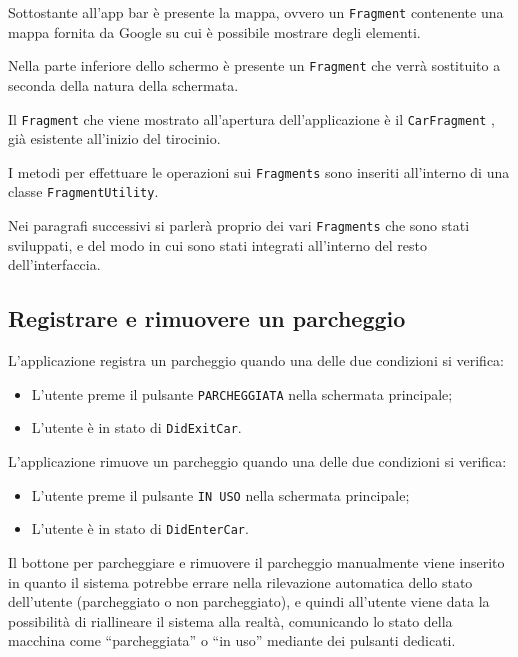 Sottostante all'app bar è presente la mappa, ovvero un \texttt{Fragment} contenente una mappa fornita da Google su cui è possibile mostrare degli elementi.

Nella parte inferiore dello schermo è presente un \texttt{Fragment} che verrà sostituito a seconda della natura della schermata.

Il \texttt{Fragment} che viene mostrato all'apertura dell'applicazione è il \texttt{CarFragment} , già esistente all'inizio del tirocinio.

I metodi per effettuare le operazioni sui \texttt{Fragments} sono inseriti all'interno di una classe \texttt{FragmentUtility}.

Nei paragrafi successivi si parlerà proprio dei vari \texttt{Fragments} che sono stati sviluppati, e del modo in cui sono stati integrati all'interno del resto dell'interfaccia.

\hypertarget{toggle-per-registrare-e-rimuovere-un-parcheggio}{%
\subsection{Registrare e rimuovere un parcheggio}\label{toggle-per-registrare-e-rimuovere-un-parcheggio}}

L'applicazione registra un parcheggio quando una delle due condizioni si verifica:

\begin{itemize}
    \item L'utente preme il pulsante \texttt{PARCHEGGIATA} nella schermata principale;
    \item L'utente è in stato di \texttt{DidExitCar}.
\end{itemize}
L'applicazione rimuove un parcheggio quando una delle due condizioni si verifica:

\begin{itemize}
    \item L'utente preme il pulsante \texttt{IN USO} nella schermata principale;
    \item L'utente è in stato di \texttt{DidEnterCar}.
\end{itemize}
Il bottone per parcheggiare e rimuovere il parcheggio manualmente viene inserito in quanto il sistema potrebbe errare nella rilevazione automatica dello stato dell'utente (parcheggiato o non parcheggiato), e quindi all'utente viene data la possibilità di riallineare il sistema alla realtà, comunicando lo stato della macchina come ``parcheggiata'' o ``in uso'' mediante dei pulsanti dedicati.

